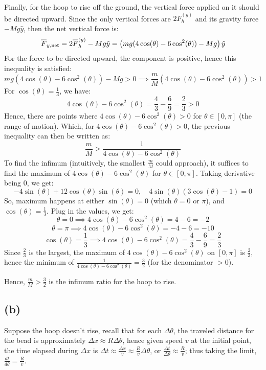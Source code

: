 \documentclass{article}
\newcommand{\bF}{\overline{F}}
\begin{document}
\hfil

Finally, for the hoop to rise off the ground, the vertical force applied on it should be directed upward. Since the only vertical forces are $2\bF_h^{(y)}$ and its gravity force $-Mg\hat{y}$, then the net vertical force is:
$$\bF_{y,\textmd{net}} = 2\bF_h^{(y)}-Mg\hat{y} = \left(mg(4\cos(\theta)-6\cos^2(\theta))-Mg\right)\hat{y}$$
For the force to be directed upward, the component is positive, hence this inequality is satisfied:
$$mg(4\cos(\theta)-6\cos^2(\theta))-Mg>0 \implies \frac{m}{M}(4\cos(\theta)-6\cos^2(\theta))>1$$ 
For $\cos(\theta)= \frac{1}{3}$, we have:
$$4\cos(\theta)-6\cos^2(\theta) =\frac{4}{3}-\frac{6}{9} = \frac{2}{3}>0$$
Hence, there are points where $4\cos(\theta)-6\cos^2(\theta)>0$ for $\theta\in [0,\pi]$ (the range of motion). Which, for $4\cos(\theta)-6\cos^2(\theta)>0$, the previous inequality can then be written as:
$$\frac{m}{M}>\frac{1}{4\cos(\theta)-6\cos^2(\theta)}$$
To find the infimum (intuitively, the smallest $\frac{m}{M}$ could approach), it suffices to find the maximum of $4\cos(\theta)-6\cos^2(\theta)$ for $\theta\in [0,\pi]$. Taking derivative being $0$, we get:
$$-4\sin(\theta)+12\cos(\theta)\sin(\theta)=0,\quad 4\sin(\theta)(3\cos(\theta)-1)=0$$
So, maximum happens at either $\sin(\theta)=0$ (which $\theta=0$ or $\pi$), and $\cos(\theta)=\frac{1}{3}$. Plug in the values, we get:
$$\theta=0\implies 4\cos(\theta)-6\cos^2(\theta) = 4-6=-2$$
$$\theta=\pi\implies 4\cos(\theta)-6\cos^2(\theta)=-4-6 = -10$$
$$\cos(\theta)=\frac{1}{3}\implies 4\cos(\theta)-6\cos^2(\theta) = \frac{4}{3}-\frac{6}{9} = \frac{2}{3}$$
Since $\frac{2}{3}$ is the largest, the maximum of $4\cos(\theta)-6\cos^2(\theta)$ on $[0,\pi]$ is $\frac{2}{3}$, hence the minimum of $\frac{1}{4\cos(\theta)-6\cos^2(\theta)} = \frac{3}{2}$ (for the denominator $>0$).

Hence, $\frac{m}{M}>\frac{3}{2}$ is the infimum ratio for the hoop to rise.
\subsection*{(b)}
Suppose the hoop doesn't rise, recall that for each $\Delta\theta$, the traveled distance for the bead is approximately $\Delta x\approx R\Delta\theta$, hence given speed $v$ at the initial point, the time elapsed during $\Delta x$ is $\Delta t\approx \frac{\Delta x}{v} \approx \frac{R}{v}\Delta \theta$, or $\frac{\Delta t}{\Delta\theta}\approx \frac{R}{v}$; thus taking the limit, $\frac{dt}{d\theta}=\frac{R}{v}$. 
\begin{comment}
Hence, for the traveling angle $\theta\in [0,\pi]$, and $v=\sqrt{2gR(1-\cos(\theta))}$, the time elapsed in total is given by:
$$\Delta t = \int_0^\pi \frac{dt}{d\theta}d\theta = \int_0^\pi \frac{R}{\sqrt{2gR(1-\cos(\theta))}}d\theta$$
Using the property $2\sin^2(t)=1-\cos(2t)$, let $t=\frac{\theta}{2}$, $dt = \frac{1}{2}d\theta$, the substitution provides:
$$\Delta t = \frac{R}{\sqrt{gR}}\int_0^\pi\frac{1}{\sqrt{2(1-\cos(\theta))}}d\theta = 2\sqrt{\frac{R}{g}}\int_0^\frac{\pi}{2}\frac{1}{\sqrt{4\sin^2(t)}}dt = 2\sqrt{\frac{R}{g}}\int_0^\frac{\pi}{2}\frac{1}{2}\csc(t)dt$$
$$0$$
\end{comment}
\end{document}
